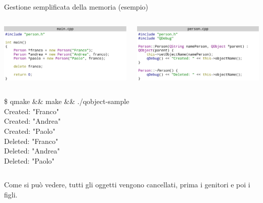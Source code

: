 \documentclass[10pt, aspectratio=169]{beamer}
\begin{document}
\begin{frame}{Gestione semplificata della memoria (esempio)}
	\begin{columns}
		\begin{block}{}
			\centering
			\includegraphics[width=\textwidth]{images/es1main.pdf}
		\end{block}
		\column{0.45\textwidth}
		\begin{block}{}
			\centering
			\includegraphics[width=\textwidth]{images/es1person.pdf}
		\end{block}
	\end{columns}
	\begin{columns}
		\column{0.5\textwidth}
		\begin{block}{}\tiny
			{\ttfamily \$ qmake \&\& make \&\& ./qobject-sample\\
				Created:  "Franco"\\
				Created:  "Andrea"\\
				Created:  "Paolo"\\
				Deleted:  "Franco"\\
				Deleted:  "Andrea"\\
				Deleted:  "Paolo"\\
			}
		\end{block}
	\end{columns}
	\bigskip
	Come si può vedere, tutti gli oggetti vengono cancellati, prima i genitori e poi i figli.
\end{frame}
\end{document}
